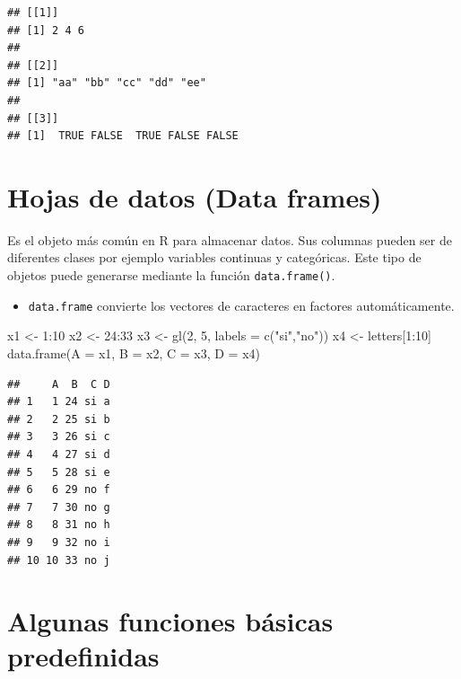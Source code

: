 \documentclass[
]{book}
\newenvironment{Shaded}{\begin{snugshade}}{\end{snugshade}}
\newcommand{\AttributeTok}[1]{\textcolor[rgb]{0.77,0.63,0.00}{#1}}
\newcommand{\DecValTok}[1]{\textcolor[rgb]{0.00,0.00,0.81}{#1}}
\newcommand{\FunctionTok}[1]{\textcolor[rgb]{0.00,0.00,0.00}{#1}}
\newcommand{\NormalTok}[1]{#1}
\newcommand{\OtherTok}[1]{\textcolor[rgb]{0.56,0.35,0.01}{#1}}
\newcommand{\SpecialCharTok}[1]{\textcolor[rgb]{0.00,0.00,0.00}{#1}}
\newcommand{\StringTok}[1]{\textcolor[rgb]{0.31,0.60,0.02}{#1}}
\newenvironment{rmdblock}[1]
{\begin{shaded*}
		\begin{itemize}
			\renewcommand{\labelitemi}{
				\raisebox{-.7\height}[0pt][0pt]{
					{\setkeys{Gin}{width=3em,keepaspectratio}\texttt{[image: images/\#1]}}
				}
			}
			\item
		}
		{
		\end{itemize}
	\end{shaded*}
}
\newenvironment{rmdnote}
{\begin{rmdblock}{note}}
	{\end{rmdblock}}
\begin{document}
\begin{verbatim}
## [[1]]
## [1] 2 4 6
## 
## [[2]]
## [1] "aa" "bb" "cc" "dd" "ee"
## 
## [[3]]
## [1]  TRUE FALSE  TRUE FALSE FALSE
\end{verbatim}

\hypertarget{hojas-de-datos-data-frames}{%
\section{Hojas de datos (Data frames)}\label{hojas-de-datos-data-frames}}

Es el objeto más común en R para almacenar datos. Sus columnas pueden ser de diferentes clases por ejemplo variables continuas y categóricas. Este tipo de objetos puede generarse mediante la función \texttt{data.frame()}.

\begin{rmdnote}
\texttt{data.frame} convierte los vectores de caracteres en factores
automáticamente.
\end{rmdnote}

\begin{Shaded}
\begin{Highlighting}[]
\NormalTok{x1 }\OtherTok{\textless{}{-}} \DecValTok{1}\SpecialCharTok{:}\DecValTok{10}
\NormalTok{x2 }\OtherTok{\textless{}{-}} \DecValTok{24}\SpecialCharTok{:}\DecValTok{33}
\NormalTok{x3 }\OtherTok{\textless{}{-}} \FunctionTok{gl}\NormalTok{(}\DecValTok{2}\NormalTok{, }\DecValTok{5}\NormalTok{, }\AttributeTok{labels =} \FunctionTok{c}\NormalTok{(}\StringTok{"si"}\NormalTok{,}\StringTok{"no"}\NormalTok{))}
\NormalTok{x4 }\OtherTok{\textless{}{-}}\NormalTok{ letters[}\DecValTok{1}\SpecialCharTok{:}\DecValTok{10}\NormalTok{]}
\FunctionTok{data.frame}\NormalTok{(}\AttributeTok{A =}\NormalTok{ x1, }\AttributeTok{B =}\NormalTok{ x2, }\AttributeTok{C =}\NormalTok{ x3, }\AttributeTok{D =}\NormalTok{ x4)}
\end{Highlighting}
\end{Shaded}

\begin{verbatim}
##     A  B  C D
## 1   1 24 si a
## 2   2 25 si b
## 3   3 26 si c
## 4   4 27 si d
## 5   5 28 si e
## 6   6 29 no f
## 7   7 30 no g
## 8   8 31 no h
## 9   9 32 no i
## 10 10 33 no j
\end{verbatim}

\hypertarget{algunas-funciones-buxe1sicas-predefinidas}{%
\section{Algunas funciones básicas predefinidas}\label{algunas-funciones-buxe1sicas-predefinidas}}
\end{document}
